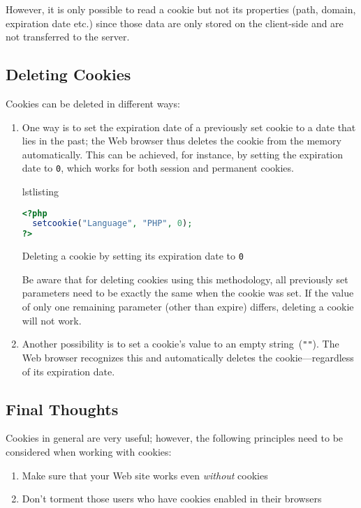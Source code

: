 \documentclass[a4paper, justified, notoc]{tufte-handout} %
\makeatletter
\newenvironment{listing}[1][htbp]
  {\ifvmode\else\unskip\fi\begin{@tufte@float}[#1]{lstlisting}{}}
  {\end{@tufte@float} } %
\makeatother
\begin{document}
However, it is only possible to read a cookie but not its properties (path, domain, expiration date etc.) since those data are only stored on the client-side and are not transferred to the server. 

\subsection{Deleting Cookies} %
\label{sub:deleting_cookies}

Cookies can be deleted in different ways:

\begin{enumerate}
	\item One way is to set the expiration date of a previously set cookie to a date that lies in the past; the Web browser thus deletes the cookie from the memory automatically. This can be achieved, for instance, by setting the expiration date to \texttt{0}, which works for both session and permanent cookies.
\begin{listing}
\begin{lstlisting}[language=PHP]
<?php
  setcookie("Language", "PHP", 0);
?>
\end{lstlisting}
	\caption{Deleting a cookie by setting its expiration date to \texttt{0}}
	\label{setting_cookies}
\end{listing}

Be aware that for deleting cookies using this methodology, all previously set parameters need to be exactly the same when the cookie was set. If the value of only one remaining parameter (other than expire) differs, deleting a cookie will not work.

	\item Another possibility is to set a cookie's value to an empty string~(\texttt{""}). The Web browser recognizes this and automatically deletes the cookie---regardless of its expiration date.
\end{enumerate}

\subsection{Final Thoughts} %
\label{sub:final_thoughts}
Cookies in general are very useful; however, the following principles need to be considered when working with cookies:
\begin{enumerate}
	\item Make sure that your Web site works even \emph{without} cookies
	\item Don't torment those users who have cookies enabled in their browsers 
\end{enumerate}
\end{document}
